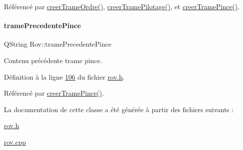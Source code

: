 Référencé par \hyperlink{rov_8cpp_source_l00230}{creer\+Trame\+Ordre()}, \hyperlink{rov_8cpp_source_l00219}{creer\+Trame\+Pilotage()}, et \hyperlink{rov_8cpp_source_l00240}{creer\+Trame\+Pince()}.

\mbox{\label{class_rov_aa8ee68edaa542473e1e5ea6bc24432ce}} 
\paragraph{\texorpdfstring{trame\+Precedente\+Pince}{tramePrecedentePince}}
{\footnotesize\ttfamily Q\+String Rov\+::trame\+Precedente\+Pince\hspace{0.3cm}{\ttfamily [private]}}



Contenu précédente trame pince. 



Définition à la ligne \hyperlink{rov_8h_source_l00106}{106} du fichier \hyperlink{rov_8h_source}{rov.\+h}.



Référencé par \hyperlink{rov_8cpp_source_l00240}{creer\+Trame\+Pince()}.



La documentation de cette classe a été générée à partir des fichiers suivants \+:\begin{DoxyCompactItemize}
\item 
\hyperlink{rov_8h}{rov.\+h}\item 
\hyperlink{rov_8cpp}{rov.\+cpp}\end{DoxyCompactItemize}
